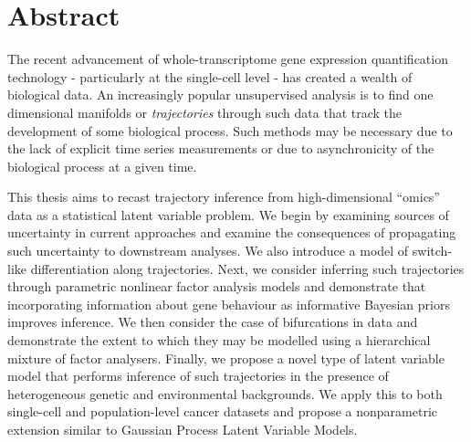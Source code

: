 \begingroup
\let\clearpage\relax
\let\cleardoublepage\relax
\let\cleardoublepage\relax

\chapter*{Abstract}

The recent advancement of whole-transcriptome gene expression quantification technology - particularly at the single-cell level - has created a wealth of biological data. An increasingly popular unsupervised analysis is to find one dimensional manifolds or \emph{trajectories} through such data that track the development of some biological process. Such methods may be necessary due to the lack of explicit time series measurements or due to asynchronicity of the biological process at a given time. 

This thesis aims to recast trajectory inference from high-dimensional ``omics'' data as a statistical latent variable problem. We begin by examining sources of uncertainty in current approaches and examine the consequences of propagating such uncertainty to downstream analyses. We also introduce a model of switch-like differentiation along trajectories. Next, we consider inferring such trajectories through parametric nonlinear factor analysis models and demonstrate that incorporating information about gene behaviour as informative Bayesian priors improves inference. We then consider the case of bifurcations in data and demonstrate the extent to which they may be modelled using a hierarchical mixture of factor analysers. Finally, we propose a novel type of latent variable model that performs inference of such trajectories in the presence of heterogeneous genetic and environmental backgrounds. We apply this to both single-cell and population-level cancer datasets and propose a nonparametric extension similar to Gaussian Process Latent Variable Models.

\endgroup
\vfill